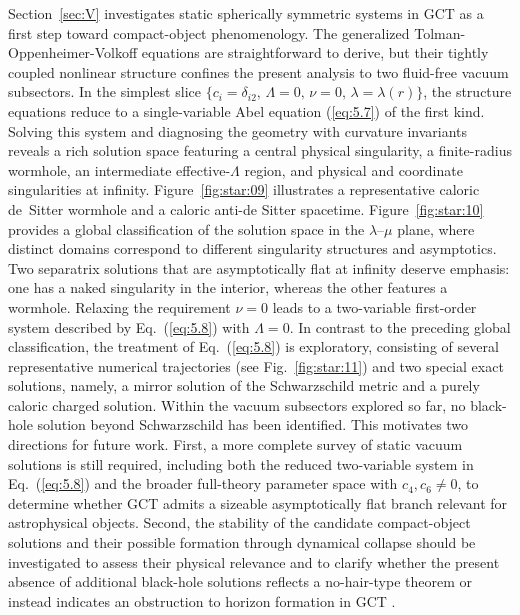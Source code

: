 \documentclass[aps,prd,twocolumn]{revtex4-2}
\begin{document}
Section~\ref{sec:V} investigates static spherically symmetric systems in GCT as a first step toward compact-object phenomenology. The generalized Tolman-Oppenheimer-Volkoff equations are straightforward to derive, but their tightly coupled nonlinear structure confines the present analysis to two fluid-free vacuum subsectors. In the simplest slice $\{c_i=\delta_{i2},\,\Lambda=0,\,\nu=0,\,\lambda=\lambda(r)\}$, the structure equations reduce to a single-variable Abel equation (\ref{eq:5.7}) of the first kind. Solving this system and diagnosing the geometry with curvature invariants reveals a rich solution space featuring a central physical singularity, a finite-radius wormhole, an intermediate effective-$\Lambda$ region, and physical and coordinate singularities at infinity. Figure~\ref{fig:star:09} illustrates a representative caloric de~Sitter wormhole and a caloric anti-de Sitter spacetime. Figure~\ref{fig:star:10} provides a global classification of the solution space in the $\lambda$--$\mu$ plane, where distinct domains correspond to different singularity structures and asymptotics. Two separatrix solutions that are asymptotically flat at infinity deserve emphasis: one has a naked singularity in the interior, whereas the other features a wormhole. Relaxing the requirement $\nu=0$ leads to a two-variable first-order system described by Eq.~(\ref{eq:5.8}) with $\Lambda=0$. In contrast to the preceding global classification, the treatment of Eq.~(\ref{eq:5.8}) is exploratory, consisting of several representative numerical trajectories (see Fig.~\ref{fig:star:11}) and two special exact solutions, namely, a mirror solution of the Schwarzschild metric and a purely caloric charged solution. Within the vacuum subsectors explored so far, no black-hole solution beyond Schwarzschild has been identified. This motivates two directions for future work. First, a more complete survey of static vacuum solutions is still required, including both the reduced two-variable system in Eq.~(\ref{eq:5.8}) and the broader full-theory parameter space with $c_4,c_6\neq0$, to determine whether GCT admits a sizeable asymptotically flat branch relevant for astrophysical objects. Second, the stability of the candidate compact-object solutions and their possible formation through dynamical collapse \cite{Penrose1965.PRL.14.57,Hawking1970.ProcRSocLondA.314.529} should be investigated to assess their physical relevance and to clarify whether the present absence of additional black-hole solutions reflects a no-hair-type theorem \cite{Israel1967.PhysRev.164.1776} or instead indicates an obstruction to horizon formation in GCT \cite{NoHairCaveat}.
\end{document}
